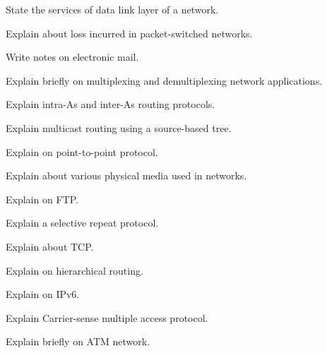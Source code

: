 \item State the services of data link layer of a network.


\markA

\partB


\item Explain about loss incurred in packet-switched networks.

\item Write notes on electronic mail.

\item Explain briefly on multiplexing and demultiplexing network applications.

\item Explain intra-As and inter-As routing protocols.

\item Explain multicast routing using a source-based tree.

\item Explain on point-to-point protocol.


\markB

\partCo

\item \iitem Explain about various physical media used in networks.

\Or


\item Explain on FTP.


\newpage
\again


\ene

\item \iitem Explain a selective repeat protocol.

\Or

\item Explain about TCP.

\ene

\item \iitem Explain on hierarchical routing.

\Or

\item Explain on IPv6.

\ene

\item \iitem Explain Carrier-sense multiple access protocol.

\Or

\item Explain briefly on ATM network.

\ene

\ene

